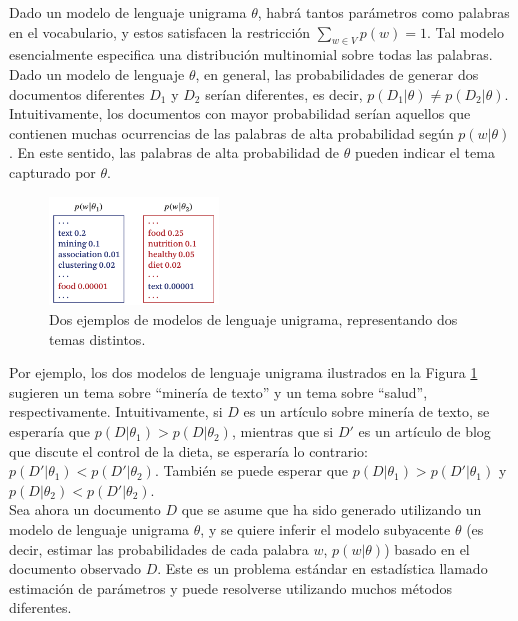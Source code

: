 Dado un modelo de lenguaje unigrama $\theta$, habrá tantos parámetros como palabras en el vocabulario, y estos satisfacen la restricción $\sum_{w \in V} p(w) = 1$. Tal modelo esencialmente especifica una distribución multinomial sobre todas las palabras. \\

Dado un modelo de lenguaje $\theta$, en general, las probabilidades de generar dos documentos diferentes $D_1$ y $D_2$ serían diferentes, es decir, $p(D_1 | \theta) \neq p(D_2 | \theta)$. Intuitivamente, los documentos con mayor probabilidad serían aquellos que contienen muchas ocurrencias de las palabras de alta probabilidad según $p(w | \theta)$. En este sentido, las palabras de alta probabilidad de $\theta$ pueden indicar el tema capturado por $\theta$. \\

\begin{figure}[h]
\centering
\includegraphics[width=0.4\textwidth]{fotos/9.png}
\caption{Dos ejemplos de modelos de lenguaje unigrama, representando dos temas distintos.}
\label{fig:9}
\end{figure}

Por ejemplo, los dos modelos de lenguaje unigrama ilustrados en la Figura \ref{fig:9} sugieren un tema sobre ``minería de texto'' y un tema sobre ``salud'', respectivamente. Intuitivamente, si $D$ es un artículo sobre minería de texto, se esperaría que $p(D | \theta_1) > p(D | \theta_2)$, mientras que si $D'$ es un artículo de blog que discute el control de la dieta, se esperaría lo contrario: $p(D' | \theta_1) < p(D' | \theta_2)$. También se puede esperar que $p(D | \theta_1) > p(D' | \theta_1)$ y $p(D | \theta_2) < p(D' | \theta_2)$. \\

Sea ahora un documento $D$ que se asume que ha sido generado utilizando un modelo de lenguaje unigrama $\theta$, y se quiere inferir el modelo subyacente $\theta$ (es decir, estimar las probabilidades de cada palabra $w$, $p(w | \theta)$) basado en el documento observado $D$. Este es un problema estándar en estadística llamado estimación de parámetros y puede resolverse utilizando muchos métodos diferentes. \\

